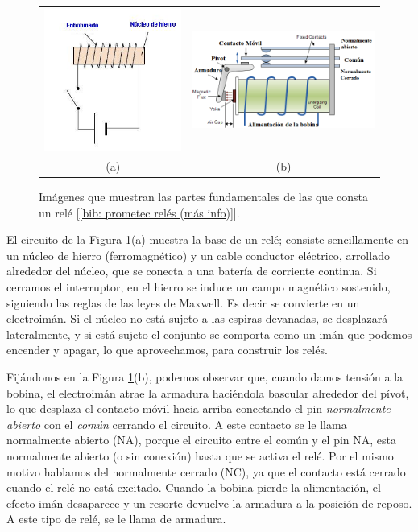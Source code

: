 \documentclass[12pt]{article}
\begin{document}
	\begin{figure}[h!]
		\begin{center}
			\begin{tabular}{cc}
				\includegraphics[width=60mm]{img/rele_1.png} &   \includegraphics[width=80mm]{img/rele_2.png} \\
				(a)  & (b)  \\[6pt]
			\end{tabular}
			\caption{Imágenes que muestran las partes fundamentales de las que consta un relé [\ref{bib: prometec relés (más info)}].}
			\label{Rele: teoria}
		\end{center}
	\end{figure}
	
	\pagebreak
	
	\noindent El circuito de la Figura \ref{Rele: teoria}(a) muestra la base de un relé; consiste sencillamente en un núcleo de hierro (ferromagnético) y un cable conductor eléctrico, arrollado alrededor del núcleo, que se conecta a una batería de corriente continua. Si cerramos el interruptor, en el hierro se induce un campo  magnético sostenido, siguiendo las reglas de las leyes de Maxwell. Es decir se convierte en un electroimán. Si el núcleo no está sujeto a las espiras devanadas, se desplazará lateralmente, y si está sujeto el conjunto se comporta como un imán que podemos encender y apagar, lo que aprovechamos, para construir los relés.
	
	\noindent Fijándonos en la Figura \ref{Rele: teoria}(b), podemos observar que, cuando damos tensión a la bobina, el electroimán atrae la armadura haciéndola bascular alrededor del pívot, lo que desplaza el contacto móvil hacia arriba conectando el pin \textit{normalmente abierto} con el \textit{común} cerrando el circuito. A este contacto se le llama normalmente abierto (NA), porque el circuito entre el común y el pin NA, esta normalmente abierto (o sin conexión) hasta que se activa el relé. Por el mismo motivo hablamos del normalmente cerrado (NC), ya que el contacto está cerrado cuando el relé no está excitado. Cuando la bobina pierde la alimentación, el efecto imán desaparece y un resorte devuelve la armadura a la posición de reposo. A este tipo de relé, se le llama de armadura.
	
\end{document}
